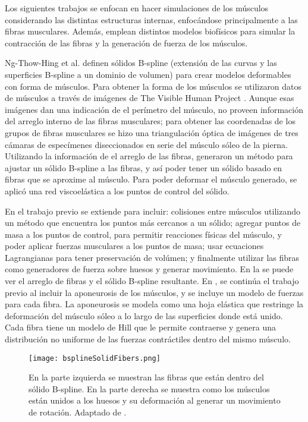 Los siguientes trabajos se enfocan en hacer simulaciones de los músculos considerando las distintas estructuras internas, enfocándose principalmente a las fibras musculares. Además, emplean distintos modelos biofísicos para simular la contracción de las fibras y la generación de fuerza de los músculos.

Ng-Thow-Hing et al. \citep{ng1998shape} definen sólidos B-spline (extensión de las curvas y las superficies B-spline a un dominio de volumen) para crear modelos deformables con forma de músculos. Para obtener la forma de los músculos se utilizaron datos de músculos a través de imágenes de The Visible Human Project \citep{visibleHumanProject}. Aunque esas imágenes dan una indicación de el perímetro del músculo, no proveen información del arreglo interno de las fibras musculares; para obtener las coordenadas de los grupos de fibras musculares se hizo una triangulación óptica de imágenes de tres cámaras de especímenes diseccionados en serie del músculo sóleo de la pierna. Utilizando la información de el arreglo de las fibras, generaron un método para ajustar un sólido B-spline a las fibras, y así poder tener un sólido basado en fibras que se aproxime al músculo. Para poder deformar el músculo generado, se aplicó una red viscoelástica a los puntos de control del sólido. 

En \citep{ng1999physically} el trabajo previo se extiende para incluir: colisiones entre músculos utilizando un método que encuentra los puntos más cercanos a un sólido; agregar puntos de masa a los puntos de control, para permitir reacciones físicas del músculo, y poder aplicar fuerzas musculares a los puntos de masa; usar ecuaciones Lagrangianas para tener preservación de volúmen; y finalmente utilizar las fibras como generadores de fuerza sobre huesos y generar movimiento. En la  se puede ver el arreglo de fibras y el sólido B-spline resultante. En \citep{ng2001muscle}, se continúa el trabajo previo al incluir la aponeurosis de los músculos, y se incluye un modelo de fuerzas para cada fibra. La aponeurosis se modela como una hoja elástica que restringe la deformación del músculo sóleo a lo largo de las superficies donde está unido. Cada fibra tiene un modelo de Hill que le permite contraerse y genera una distribución no uniforme de las fuerzas contráctiles dentro del mismo músculo.

\begin{figure}
	\centering
		\texttt{[image: bsplineSolidFibers.png]}
	\caption[Simulación de músculos con sólidos B-spline.]{En la parte izquierda se muestran las fibras que están dentro del sólido B-spline. En la parte derecha se muestra como los músculos están unidos a los huesos y su deformación al generar un movimiento de rotación. Adaptado de \citep{ng1999physically}.}
		\label{fig:bsplineSolidFibers}
\end{figure}

